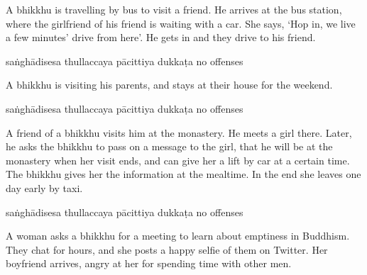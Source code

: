 \begin{exam}{\autoExamName}
\begin{problem*}
\begin{parts}
  \bigskip

\item A bhikkhu is travelling by bus to visit a friend. He arrives at the bus
  station, where the girlfriend of his friend is waiting with a car. She says,
  `Hop in, we live a few minutes' drive from here'. He gets in and they drive to
  his friend.

  \bigskip

  \begin{answers}{5}
    \bChoices
     saṅghādisesa\eAns
     thullaccaya\eAns
     pācittiya\eAns
     dukkaṭa\eAns
     no offenses\eAns
    \eChoices
  \end{answers}

  \bigskip

\item A bhikkhu is visiting his parents, and stays at their house for the weekend.

  \bigskip

  \begin{answers}{5}
    \bChoices
     saṅghādisesa\eAns
     thullaccaya\eAns
     pācittiya\eAns
     dukkaṭa\eAns
     no offenses\eAns
    \eChoices
  \end{answers}

  \bigskip

\item A friend of a bhikkhu visits him at the monastery. He meets a girl there.
  Later, he asks the bhikkhu to pass on a message to the girl, that he will be
  at the monastery when her visit ends, and can give her a lift by car at a
  certain time. The bhikkhu gives her the information at the mealtime. In the
  end she leaves one day early by taxi. 

  \bigskip

  \begin{answers}{5}
    \bChoices
     saṅghādisesa\eAns
     thullaccaya\eAns
     pācittiya\eAns
     dukkaṭa\eAns
     no offenses\eAns
    \eChoices
  \end{answers}

  \bigskip

\item A woman asks a bhikkhu for a meeting to learn about emptiness in Buddhism.
  They chat for hours, and she posts a happy selfie of them on Twitter. Her
  boyfriend arrives, angry at her for spending time with other men.

  \bigskip


\end{parts}
\end{problem*}
\end{exam}
